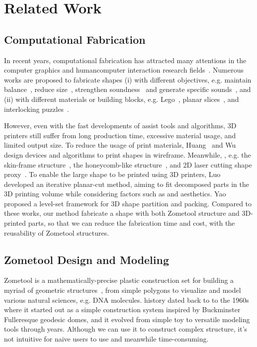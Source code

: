 \section{Related Work}
\label{sec:relatedwork}

\subsection{Computational Fabrication}
In recent years, computational fabrication has attracted many attentions in the computer graphics and human\chinky{-}computer interaction research fields~\cite{Shamir:2016:CTP}.
Numerous works are proposed to fabricate shapes 
(i) with different objectives, e.g.\chinky{,} maintain balance~\cite{Prevost:MIS:2013,SpinIt:Baecher:2014}, reduce size~\cite{Luo:2012:CPM}, strengthen  soundness~\cite{Zhou:2013:WSA} and generate specific sounds~\cite{Umetani:2016:PIR}, and 
(ii) with different materials or building blocks, e.g.\chinky{,} Lego~\cite{Luo:2015:LOL}, planar slices~\cite{Cignoni:2014:FMJ}, and interlocking puzzles~\cite{Song-2012-InterCubes}.

However, even with the fast developments of assist tools and algorithms, 3D printers still suffer from long production time, excessive material usage, and limited output size.
To reduce the usage of print materials, Huang~\cite{Huang:2016:FRF} and Wu~\cite{Wu:2016:PAM} design devices and algorithms to print shapes in wireframe.
Meanwhile, , e.g.\chinky{,} the skin-frame structure~\cite{Wang:2013:CPO}, the honeycomb-like structure~\cite{Lu:2014:BSW}, and 2D laser cutting shape proxy~\cite{Song-2016-CofiFab}.
To enable the large shape to be printed using 3D printers, Luo~\etal~\cite{Luo:2012:CPM} developed an iterative planar-cut method, aiming to fit decomposed parts in the 3D printing volume while considering factors such as  and aesthetics.
Yao~\etal~\cite{Yao:2015:LPP} proposed a level-set framework for 3D shape partition and packing.
Compared to these works, our method fabricate a shape with both Zometool structure and 3D-printed parts, so that we can reduce the fabrication time and cost, with the reusability of Zometool structures. 

\subsection{Zometool Design and Modeling}
Zometool is a mathematically-precise plastic construction set for building a myriad of geometric structures~\cite{davis2007mathematics}, from simple polygons to visualize and model various natural sciences, e.g. DNA molecules.
 history dated back to to the 1960s where it started out as a simple construction system inspired by Buckminster Fulleresque geodesic domes, and it evolved from simple toy to versatile modeling tools through years.
Although we can use it to construct  complex structure, it's not intuitive for naive users to use and meanwhile time-consuming.

